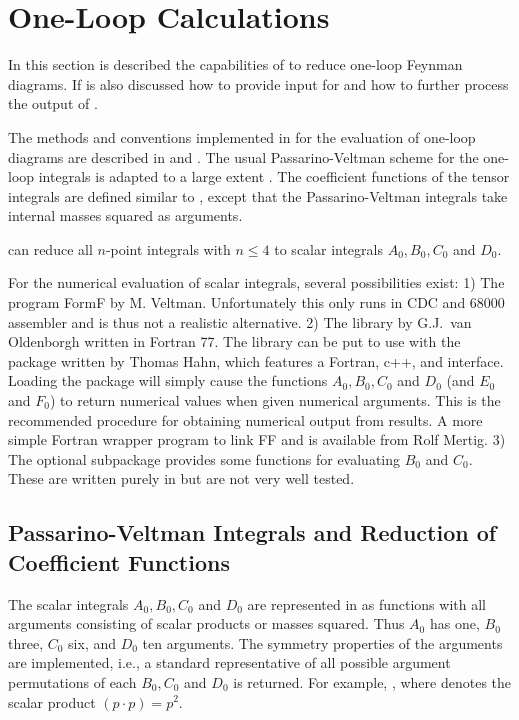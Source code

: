 \section{One-Loop Calculations}

In this section is described the capabilities of \fc to reduce one-loop Feynman diagrams. If is also discussed how to provide input for \fc and how to further process the output of \fc.

The methods and conventions implemented in \fc for the evaluation of one-loop diagrams are described in \cite{ansgar} and \cite{feyncalc}. The usual Passarino-Veltman scheme for the one-loop integrals is adapted to a large extent \cite{ansgar}.  The coefficient functions of the  tensor integrals are defined  similar to \cite{ansgar}, except that the Passarino-Veltman integrals take internal masses squared  as arguments.

\fc can reduce all $n$-point integrals with $n\leq 4$ to scalar integrals $A_0, B_0, C_0$ and $D_0$.

For the numerical evaluation of scalar integrals, several possibilities exist: 1) The program FormF by M. Veltman. Unfortunately this only runs in CDC and 68000 assembler and is thus not a realistic alternative. 2) The library \FF by G.J.~van Oldenborgh \cite{Ol91} written in Fortran 77. The library can be put to use with the \lpts package \cite{Hahn:1998yk} written by Thomas Hahn, which features a Fortran, c++, and \mma interface. Loading the \mma package will simply cause the functions $A_0, B_0, C_0$ and $D_0$ (and $E_0$ and $F_0$) to return numerical values when given numerical arguments. This is the recommended procedure for obtaining numerical output from \fc results. A more simple Fortran wrapper program to link FF and \fc is available from Rolf Mertig. 3) The optional subpackage \fphi provides some functions for evaluating $B_0$ and $C_0$. These are written purely in \mma but are not very well tested.

\subsection{Passarino-Veltman Integrals and Reduction of Coefficient Functions}
\label{passvelt}

The scalar integrals $A_0, B_0, C_0$ and $D_0$ are represented
in \fc as functions with all arguments consisting of scalar products or 
masses squared. Thus $A_0$ has one, $B_0$ three, $C_0$ six, and 
$D_0$ ten arguments. The symmetry properties of the arguments  are 
implemented, i.e., a standard representative of all possible 
argument permutations of each $ B_0, C_0$ and $D_0$ is returned.
For example,  \ra {}, where 
 denotes the scalar product $(p\cdot p) = p^2$.

